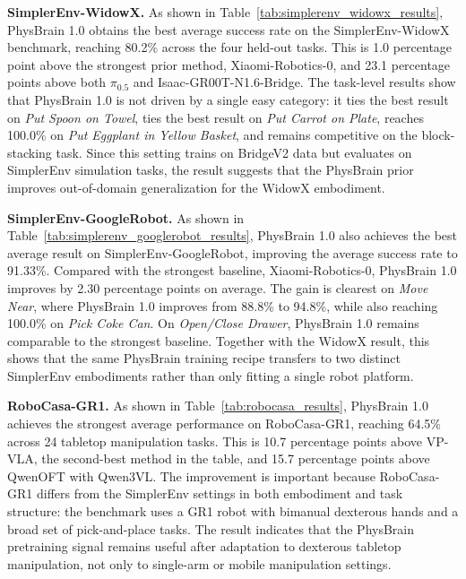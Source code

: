 \documentclass{llmxive}
\providecommand{\paragraph}[1]{\noindent\textbf{#1.}\hspace*{1em}}
\begin{document}
\paragraph{SimplerEnv-WidowX}
As shown in Table~\ref{tab:simplerenv_widowx_results}, PhysBrain 1.0 obtains the best average success rate on the SimplerEnv-WidowX benchmark, reaching 80.2\% across the four held-out tasks. This is 1.0 percentage point above the strongest prior method, Xiaomi-Robotics-0, and 23.1 percentage points above both $\pi_{0.5}$ and Isaac-GR00T-N1.6-Bridge. The task-level results show that PhysBrain 1.0 is not driven by a single easy category: it ties the best result on \emph{Put Spoon on Towel}, ties the best result on \emph{Put Carrot on Plate}, reaches 100.0\% on \emph{Put Eggplant in Yellow Basket}, and remains competitive on the block-stacking task. Since this setting trains on BridgeV2 data but evaluates on SimplerEnv simulation tasks, the result suggests that the PhysBrain prior improves out-of-domain generalization for the WidowX embodiment.

\paragraph{SimplerEnv-GoogleRobot}
As shown in Table~\ref{tab:simplerenv_googlerobot_results}, PhysBrain 1.0 also achieves the best average result on SimplerEnv-GoogleRobot, improving the average success rate to 91.33\%. Compared with the strongest baseline, Xiaomi-Robotics-0, PhysBrain 1.0 improves by 2.30 percentage points on average. The gain is clearest on \emph{Move Near}, where PhysBrain 1.0 improves from 88.8\% to 94.8\%, while also reaching 100.0\% on \emph{Pick Coke Can}. On \emph{Open/Close Drawer}, PhysBrain 1.0 remains comparable to the strongest baseline. Together with the WidowX result, this shows that the same PhysBrain training recipe transfers to two distinct SimplerEnv embodiments rather than only fitting a single robot platform.

\paragraph{RoboCasa-GR1}
As shown in Table~\ref{tab:robocasa_results}, PhysBrain 1.0 achieves the strongest average performance on RoboCasa-GR1, reaching 64.5\% across 24 tabletop manipulation tasks. This is 10.7 percentage points above VP-VLA, the second-best method in the table, and 15.7 percentage points above QwenOFT with Qwen3VL. The improvement is important because RoboCasa-GR1 differs from the SimplerEnv settings in both embodiment and task structure: the benchmark uses a GR1 robot with bimanual dexterous hands and a broad set of pick-and-place tasks. The result indicates that the PhysBrain pretraining signal remains useful after adaptation to dexterous tabletop manipulation, not only to single-arm or mobile manipulation settings.
\end{document}
